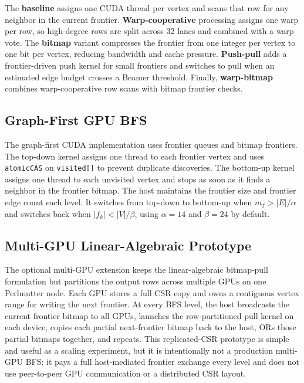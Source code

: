 \documentclass[11pt]{article}
\begin{document}
The \textbf{baseline} assigns one CUDA thread per vertex and scans that row for
any neighbor in the current frontier. \textbf{Warp-cooperative} processing
assigns one warp per row, so high-degree rows are split across 32 lanes and
combined with a warp vote. The \textbf{bitmap} variant compresses the frontier
from one integer per vertex to one bit per vertex, reducing bandwidth and cache
pressure. \textbf{Push-pull} adds a frontier-driven push kernel for small
frontiers and switches to pull when an estimated edge budget crosses a Beamer
threshold. Finally, \textbf{warp-bitmap} combines warp-cooperative row scans
with bitmap frontier checks.

\subsection{Graph-First GPU BFS}

The graph-first CUDA implementation uses frontier queues and bitmap frontiers.
The top-down kernel assigns one thread to each frontier vertex and
uses \texttt{atomicCAS} on \texttt{visited[]} to prevent duplicate discoveries.
The bottom-up kernel assigns one thread to each unvisited vertex and stops as
soon as it finds a neighbor in the frontier bitmap. The host maintains the
frontier size and frontier edge count each level. It switches from top-down to
bottom-up when $m_f > |E|/\alpha$ and switches back when
$|f_k| < |V|/\beta$, using $\alpha=14$ and $\beta=24$ by default.

\subsection{Multi-GPU Linear-Algebraic Prototype}

The optional multi-GPU extension keeps the linear-algebraic bitmap-pull
formulation but partitions the output rows across multiple GPUs on one
Perlmutter node. Each GPU stores a full CSR copy and owns a contiguous vertex
range for writing the next frontier. At every BFS level, the host broadcasts
the current frontier bitmap to all GPUs, launches the row-partitioned pull
kernel on each device, copies each partial next-frontier bitmap back to the
host, ORs those partial bitmaps together, and repeats. This replicated-CSR
prototype is simple and useful as a scaling experiment, but it is intentionally
not a production multi-GPU BFS: it pays a full host-mediated frontier exchange
every level and does not use peer-to-peer GPU communication or a distributed
CSR layout.
\end{document}
